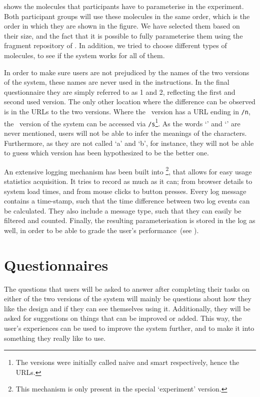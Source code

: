  shows the molecules that participants have to parameterise in the experiment. Both participant groups will use these molecules in the same order, which is the order in which they are shown in the figure. We have selected them based on their size, and the fact that it is possible to fully parameterise them using the fragment repository of \oframp. In addition, we tried to choose different types of molecules, to see if the system works for all of them.

In order to make sure users are not prejudiced by the names of the two versions of the system, these names are never used in the instructions. In the final questionnaire they are simply referred to as 1 and 2, reflecting the first and second used version. The only other location where the difference can be observed is in the URLs to the two versions. Where the \IDa\ version has a URL ending in \verb|/n|, the \IDb\ version of the system can be accessed via \verb|/s|\footnote{The versions were initially called naive and smart respectively, hence the URLs.}. As the words `\IDa' and `\IDb' are never mentioned, users will not be able to infer the meanings of the characters. Furthermore, as they are not called `a' and `b', for instance, they will not be able to guess which version has been hypothesized to be the better one.

An extensive logging mechanism has been built into \oframp\footnote{This mechanism is only present in the special `experiment' version.}, that allows for easy usage statistics acquisition. It tries to record as much as it can; from browser details to system load times, and from mouse clicks to button presses. Every log message contains a time-stamp, such that the time difference between two log events can be calculated. They also include a message type, such that they can easily be filtered and counted. Finally, the resulting parameterisation is stored in the log as well, in order to be able to grade the user's performance~(see ).



\section{Questionnaires}
The questions that users will be asked to answer after completing their tasks on either of the two versions of the system will mainly be questions about how they like the design and if they can see themselves using it. Additionally, they will be asked for suggestions on things that can be improved or added. This way, the user's experiences can be used to improve the system further, and to make it into something they really like to use.

